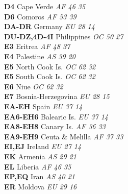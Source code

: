 ﻿\documentclass[landscape,a4paper]{article}
\begin{document}
\begin{multicols}{6}
\textbf{D4                      } Cape Verde                         \emph{ AF     46     35    } \\
\textbf{D6                      } Comoros                            \emph{ AF     53     39    } \\
\textbf{DA-DR                   } Germany                            \emph{ EU     28     14    } \\
\textbf{DU-DZ,4D-4I             } Philippines                        \emph{ OC     50     27    } \\
\textbf{E3                      } Eritrea                            \emph{ AF     48     37    } \\
\textbf{E4                      } Palestine                          \emph{ AS     39     20    } \\
\textbf{E5                      } North Cook Is.                     \emph{ OC     62     32    } \\
\textbf{E5                      } South Cook Is.                     \emph{ OC     62     32    } \\
\textbf{E6                      } Niue                               \emph{ OC     62     32    } \\
\textbf{E7                      } Bosnia-Herzegovina                 \emph{ EU     28     15    } \\
\textbf{EA-EH                   } Spain                              \emph{ EU     37     14    } \\
\textbf{EA6-EH6                 } Balearic Is.                       \emph{ EU     37     14    } \\
\textbf{EA8-EH8                 } Canary Is.                         \emph{ AF     36     33    } \\
\textbf{EA9-EH9                 } Ceuta \& Melilla                   \emph{ AF     37     33    } \\
\textbf{EI,EJ                   } Ireland                            \emph{ EU     27     14    } \\
\textbf{EK                      } Armenia                            \emph{ AS     29     21    } \\
\textbf{EL                      } Liberia                            \emph{ AF     46     35    } \\
\textbf{EP,EQ                   } Iran                               \emph{ AS     40     21    } \\
\textbf{ER                      } Moldova                            \emph{ EU     29     16    } \\

\end{multicols}
\end{document}
